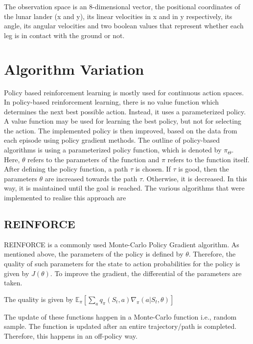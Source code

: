 \documentclass{article}
\begin{document}
The observation space is an 8-dimensional vector, the positional coordinates of the lunar lander (x and y), its linear velocities in x and in y respectively, its angle, its angular velocities and two boolean values that represent whether each leg is in contact with the ground or not. 

\section{Algorithm Variation}
Policy based reinforcement learning is mostly used for continuous action spaces. In policy-based reinforcement learning, there is no value function which determines the next best possible action. Instead, it uses a parameterized policy. A value function may be used for learning the best policy, but not for selecting the action. The implemented policy is then improved, based on the data from each episode using policy gradient methods. \cite{sutton-barlo}
The outline of policy-based algorithms is using a parameterized policy function, which is denoted by $\pi_\Theta$. 
Here, $\theta$ refers to the parameters of the function and $\pi$ refers to the function itself. After defining the policy function, a path $\tau$ is chosen. If $\tau$ is good, then the parameters $\theta$ are increased towards the path $\tau$. Otherwise, it is decreased. In this way, it is maintained until the goal is reached.    \cite{plaat-deeprl}
The various algorithms that were implemented to realise this approach are
\subsection{REINFORCE}
\quad REINFORCE is a commonly used Monte-Carlo Policy Gradient algorithm. As mentioned above, the parameters of the policy is defined by $\theta$. Therefore, the quality of such parameters for the state to action probabilities for the policy is given by $J(\theta)$. To improve the gradient, the differential of the parameters are taken. 

\newline The quality is given by $\mathbb{E}_\pi [ \sum _a q_\pi(S_t, a)\nabla_\pi(a|S_t, \theta)]$

\newline The update of these functions happen in a Monte-Carlo function i.e., random sample. The function is updated after an entire trajectory/path is completed. Therefore, this happens in an off-policy way.  
\end{document}
